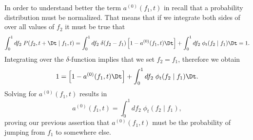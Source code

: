 In order to understand better the term $a^{(0)}(f_1, t)$ in
 recall that a probability distribution must be
normalized. That means that if we integrate both sides of
 over all values of $f_2$ it must be true that
\begin{equation}
  \int_0^1 df_2 \; P(f_2, t + \Dt \mid f_1, t) =
  \int_0^1 df_2 \; \delta(f_2 - f_1) \left[ 1 - a^{(0)}(f_1, t) \Dt \right]
  + \int_0^1 df_2 \; \phi_t(f_2 \mid f_1)\Dt
  = 1.
\end{equation}
Integrating over the $\delta$-function implies that we set $f_2 = f_1$,
therefore we obtain
\begin{equation}
  1 = \left[  1 - a^{(0)}(f_1, t) \Dt\right] +
  \int_0^1 df_2 \; \phi_t(f_2 \mid f_1)\Dt.
\end{equation}
Solving for $a^{(0)}(f_1, t)$ results in
\begin{equation}
  a^{(0)}(f_1, t) = \int_0^1 df_2 \; \phi_t(f_2 \mid f_1),
  \label{eq_a0}
\end{equation}
proving our previous assertion that $a^{(0)}(f_1, t)$ must be the
probability of jumping from $f_1$ to somewhere else.


